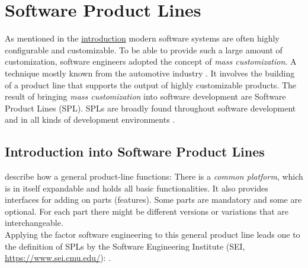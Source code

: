 \section{Software Product Lines}

As mentioned in the \hyperref[sec:introduction]{introduction} modern software systems are often highly configurable and customizable. To be able to provide such a large amount of customization, software engineers adopted the concept of \textit{mass customization}. A technique mostly known from the automotive industry \cite{SPLEngineering}. It involves the building of a product line that supports the output of highly customizable products. The result of bringing \textit{mass customization} into software development are Software Product Lines (SPL). SPLs are broadly found throughout software development and in all kinds of development environments \cite{Reportof2010USArmySPLWorkshop,DynamicSoftwareProductLines}. 

\subsection{Introduction into Software Product Lines}\label{sec:SPLIntroduction}
\citet{SPLEngineering} describe how a general product-line functions: There is a \textit{common platform}, which is in itself expandable and holds all basic functionalities. It also provides interfaces for adding on parts (features). Some parts are mandatory and some are optional. For each part there might be different versions or variations that are interchangeable.\\
Applying the factor software engineering to this general product line leads one to the definition of SPLs by the Software Engineering Institute (SEI, \url{https://www.sei.cmu.edu/}): \cite{SalionIncASPLCaseStudy}.


